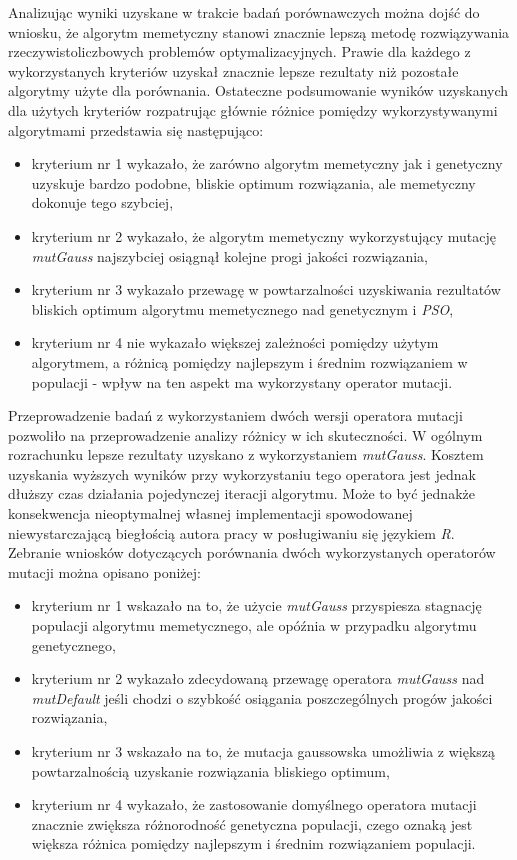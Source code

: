 \par
Analizując wyniki uzyskane w trakcie badań porównawczych można dojść do wniosku, że algorytm memetyczny stanowi znacznie lepszą metodę rozwiązywania rzeczywistoliczbowych problemów optymalizacyjnych. Prawie dla każdego z wykorzystanych kryteriów uzyskał znacznie lepsze rezultaty niż pozostałe algorytmy użyte dla porównania. Ostateczne podsumowanie wyników uzyskanych dla użytych kryteriów rozpatrując głównie różnice pomiędzy wykorzystywanymi algorytmami przedstawia się następująco:
\begin{itemize}
\item kryterium nr 1 wykazało, że zarówno algorytm memetyczny jak i genetyczny uzyskuje bardzo podobne, bliskie optimum rozwiązania, ale memetyczny dokonuje tego szybciej, 
\item kryterium nr 2 wykazało, że algorytm memetyczny wykorzystujący mutację \emph{mutGauss} najszybciej osiągnął kolejne progi jakości rozwiązania, 
\item kryterium nr 3 wykazało przewagę w powtarzalności uzyskiwania rezultatów bliskich optimum algorytmu memetycznego nad genetycznym i \emph{PSO},
\item kryterium nr 4 nie wykazało większej zależności pomiędzy użytym algorytmem, a różnicą pomiędzy najlepszym i średnim rozwiązaniem w populacji - wpływ na ten aspekt ma wykorzystany operator mutacji.
\end{itemize}

\par 
Przeprowadzenie badań z wykorzystaniem dwóch wersji operatora mutacji pozwoliło na przeprowadzenie analizy różnicy w ich skuteczności. W ogólnym rozrachunku lepsze rezultaty uzyskano z wykorzystaniem \emph{mutGauss}. Kosztem uzyskania wyższych wyników przy wykorzystaniu tego operatora jest jednak dłuższy czas działania pojedynczej iteracji algorytmu. Może to być jednakże konsekwencja nieoptymalnej własnej implementacji spowodowanej niewystarczającą biegłością autora pracy w posługiwaniu się językiem \emph{R}. Zebranie wniosków dotyczących porównania dwóch wykorzystanych operatorów mutacji można opisano poniżej:
\begin{itemize}
\item kryterium nr 1 wskazało na to, że użycie \emph{mutGauss} przyspiesza stagnację populacji algorytmu memetycznego, ale opóźnia w przypadku algorytmu genetycznego,
\item kryterium nr 2 wykazało zdecydowaną przewagę operatora \emph{mutGauss} nad \emph{mutDefault} jeśli chodzi o szybkość osiągania poszczególnych progów jakości rozwiązania,
\item kryterium nr 3 wskazało na to, że mutacja gaussowska umożliwia z większą powtarzalnością uzyskanie rozwiązania bliskiego optimum,
\item kryterium nr 4 wykazało, że zastosowanie domyślnego operatora mutacji znacznie zwiększa różnorodność genetyczna populacji, czego oznaką jest większa różnica pomiędzy najlepszym i średnim rozwiązaniem populacji.
\end{itemize}

